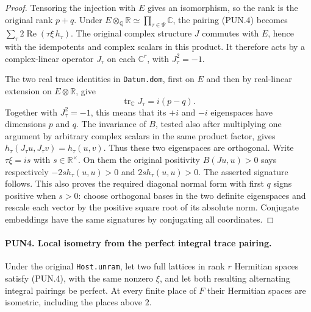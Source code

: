 \begin{proof}
Tensoring the injection with \(E\) gives an isomorphism, so the
rank is the original rank \(p+q\).  Under
\(E\otimes_{\mathbb Q}\mathbb R\simeq\prod_{\tau\in\Psi}\mathbb C\),
the pairing (PUN.4) becomes
\(\sum_\tau2\operatorname{Re}(\tau\xi\,h_\tau)\).
The original complex structure \(J\) commutes with \(E\), hence
with the idempotents and complex scalars in this product.  It
therefore acts by a complex-linear operator \(J_\tau\) on each
\(\mathbb C^r\), with \(J_\tau^2=-1\).

The two real trace identities in \texttt{Datum.dom}, first on
\(E\) and then by real-linear extension on
\(E\otimes\mathbb R\), give
\[
 \operatorname{tr}_{\mathbb C}J_\tau=i(p-q).
 \tag{PUN.5}
\]
Together with \(J_\tau^2=-1\), this means that its \(+i\) and
\(-i\) eigenspaces have dimensions \(p\) and \(q\).
The invariance of \(B\), tested also after multiplying one argument
by arbitrary complex scalars in the same product factor, gives
\(h_\tau(J_\tau u,J_\tau v)=h_\tau(u,v)\).  Thus these two
eigenspaces are orthogonal.  Write \(\tau\xi=is\) with
\(s\in\mathbb R^\times\).  On them the original positivity
\(B(Ju,u)>0\) says respectively
\(-2s h_\tau(u,u)>0\) and \(2s h_\tau(u,u)>0\).
The asserted signature follows.  This also proves the required
diagonal normal form with first \(q\) signs positive when \(s>0\):
choose orthogonal bases in the two definite eigenspaces and rescale
each vector by the positive square root of its absolute norm.
Conjugate embeddings have the same signatures by conjugating all
coordinates.
\end{proof}

\paragraph{PUN4. Local isometry from the perfect integral trace pairing.}
\label{claim:PUN4}
Under the original \texttt{Host.unram}, let two full lattices in
rank \(r\) Hermitian spaces satisfy (PUN.4), with the same nonzero
\(\xi\), and let both resulting alternating integral pairings be
perfect.  At every finite place of \(F\) their Hermitian spaces
are isometric, including the places above \(2\).

